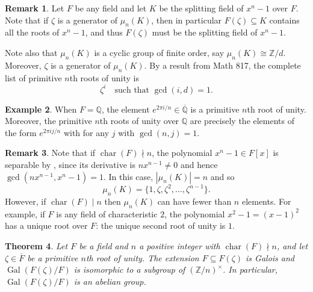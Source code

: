 \documentclass[12pt]{report}
\newtheorem{theorem}{Theorem}[chapter]
\numberwithin{equation}{section}
\numberwithin{theorem}{chapter}
\theoremstyle{definition}
\newtheorem{example}[theorem]{Example}
\newtheorem*{basic properties}{Basic Properties}
\newtheorem*{Important Remark}{Important Remark}
\newtheorem{remark}[theorem]{Remark}
\DeclareMathOperator{\Gal}{Gal}
\DeclareMathOperator{\ch}{char}
\begin{document}
\begin{remark}
Let $F$ be any field and let $K$ be the splitting field of $x^n - 1$ over $F$. Note that if $\zeta$ is a generator of $\mu_n(K)$, then in particular $F(\zeta) \subseteq K$ contains all the roots of $x^n-1$, and thus $F(\zeta)$ must be the splitting field of $x^n-1$.

Note also that $\mu_n(K)$ is a cyclic group of finite order, say $\mu_n(K) \cong \mathbb{Z}/d$. Moreover, $\zeta$ is a generator of $\mu_n(K)$. By a result from Math 817, the complete list of primitive $n$th roots of unity is 
$$\zeta^i \quad \textrm{such that } \gcd(i,d) = 1.$$
\end{remark}



\begin{example}
When $F = \mathbb{Q}$, the element $e^{2 \pi i/n} \in \overline{\mathbb{Q}}$ is a primitive $n$th root of unity. Moreover, the primitive $n$th roots of unity over $\mathbb{Q}$ are precisely the elements of the form $e^{2 \pi i j/n}$ with for any $j$ with $\gcd(n, j) = 1$.
\end{example}

\begin{remark}\label{primitive root generates splitting field}
Note that if $\ch(F) \nmid n$, the polynomial $x^n - 1 \in F[x]$ is separable by , since its derivative is $nx^{n-1} \neq 0$ and hence $\gcd(nx^{n-1}, x^n - 1) = 1$. In this case, $|\mu_n(K)|=n$ and so 
$$\mu_n(K) =\{1, \zeta, \zeta^2,\ldots, \zeta^{n-1}\}.$$
However, if $\ch(F) \mid n$ then $\mu_n(K)$ can have fewer than $n$ elements. For example, if $F$ is any field of characteristic $2$, the polynomial $x^2-1=(x-1)^2$ has a unique root over $F$: the unique second root of unity is $1$.
\end{remark}



\begin{theorem}\label{primitive roots unity galois abelian}
Let $F$ be a field and $n$ a positive integer with $\ch(F) \nmid n$, and let $\zeta \in \overline{F}$ be a primitive $n$th root of unity. The extension $F \subseteq F(\zeta)$ is Galois and $\Gal(F(\zeta)/F)$ is isomorphic to a subgroup of $(\mathbb{Z}/n)^\times$. In particular, $\Gal(F(\zeta)/F)$ is an abelian group.
\end{theorem}
\end{document}
